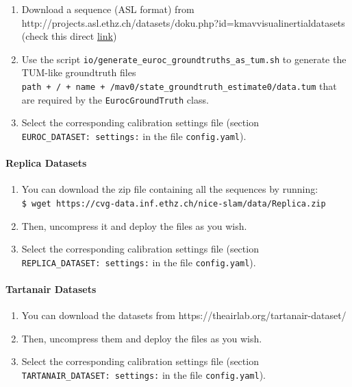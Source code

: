 \documentclass{article}
\providecommand{\tightlist}{%
  \setlength{\itemsep}{0pt}\setlength{\parskip}{0pt}}
\let\oldparagraph\paragraph
\renewcommand{\paragraph}[1]{\oldparagraph{#1}\mbox{}}
\begin{document}
\begin{enumerate}
\def\labelenumi{\arabic{enumi}.}
\tightlist
\item
  Download a sequence (ASL format) from
  http://projects.asl.ethz.ch/datasets/doku.php?id=kmavvisualinertialdatasets
  (check this direct
  \href{http://robotics.ethz.ch/~asl-datasets/ijrr_euroc_mav_dataset/}{link})
\item
  Use the script \texttt{io/generate\_euroc\_groundtruths\_as\_tum.sh}
  to generate the TUM-like groundtruth files
  \texttt{path\ +\ \textquotesingle{}/\textquotesingle{}\ +\ name\ +\ \textquotesingle{}/mav0/state\_groundtruth\_estimate0/data.tum\textquotesingle{}}
  that are required by the \texttt{EurocGroundTruth} class.
\item
  Select the corresponding calibration settings file (section
  \texttt{EUROC\_DATASET:\ settings:} in the file \texttt{config.yaml}).
\end{enumerate}

\hypertarget{replica-datasets}{%
\paragraph{Replica Datasets}\label{replica-datasets}}

\begin{enumerate}
\def\labelenumi{\arabic{enumi}.}
\tightlist
\item
  You can download the zip file containing all the sequences by
  running:\\
  \texttt{\$\ wget\ https://cvg-data.inf.ethz.ch/nice-slam/data/Replica.zip}~\\
\item
  Then, uncompress it and deploy the files as you wish.
\item
  Select the corresponding calibration settings file (section
  \texttt{REPLICA\_DATASET:\ settings:} in the file
  \texttt{config.yaml}).
\end{enumerate}

\hypertarget{tartanair-datasets}{%
\paragraph{Tartanair Datasets}\label{tartanair-datasets}}

\begin{enumerate}
\def\labelenumi{\arabic{enumi}.}
\tightlist
\item
  You can download the datasets from
  https://theairlab.org/tartanair-dataset/\\
\item
  Then, uncompress them and deploy the files as you wish.
\item
  Select the corresponding calibration settings file (section
  \texttt{TARTANAIR\_DATASET:\ settings:} in the file
  \texttt{config.yaml}).
\end{enumerate}
\end{document}
